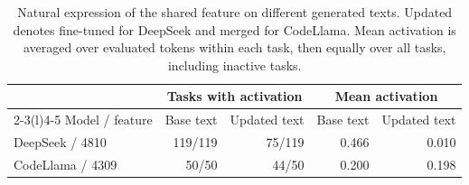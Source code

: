 \begin{table}[t]
\centering\small
\caption{Natural expression of the shared feature on different generated texts. Updated denotes fine-tuned for DeepSeek and merged for CodeLlama. Mean activation is averaged over evaluated tokens within each task, then equally over all tasks, including inactive tasks.}
\label{tab:case-natural-expression}
\setlength{\tabcolsep}{4pt}
\begin{tabular}{@{}lrrrr@{}}
\toprule
 & \multicolumn{2}{c}{Tasks with activation} & \multicolumn{2}{c}{Mean activation} \\
\cmidrule(lr){2-3}\cmidrule(l){4-5}
Model / feature & Base text & Updated text & Base text & Updated text \\
\midrule
DeepSeek / 4810 & 119/119 & 75/119 & 0.466 & 0.010 \\
CodeLlama / 4309 & 50/50 & 44/50 & 0.200 & 0.198 \\
\bottomrule
\end{tabular}
\end{table}
